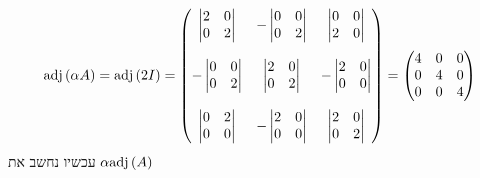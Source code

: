 \documentclass[12pt, titlepage]{article}
\begin{document}
\[
    \mathrm{adj}\left(\alpha A\right) = \mathrm{adj}\left(2I\right) = \begin{pmatrix}
        \begin{vmatrix} 2 & 0 \\ 0 & 2 \end{vmatrix} & -\begin{vmatrix} 0 & 0 \\ 0 & 2 \end{vmatrix} & \begin{vmatrix} 0 & 0 \\ 2 & 0 \end{vmatrix} \\ \\
 -       \begin{vmatrix} 0 & 0 \\ 0 & 2 \end{vmatrix} & \begin{vmatrix} 2 & 0 \\0 & 2 \end{vmatrix} & -\begin{vmatrix} 2 & 0 \\ 0 & 0\end{vmatrix} \\ \\
        \begin{vmatrix} 0 & 2 \\ 0 & 0\end{vmatrix} & -\begin{vmatrix} 2 & 0 \\ 0 & 0 \end{vmatrix} & \begin{vmatrix} 2 & 0 \\ 0 & 2\end{vmatrix}
     \end{pmatrix} = \begin{pmatrix}
        4 & 0 & 0 \\ 0 & 4 & 0 \\ 0 & 0 & 4        
     \end{pmatrix}
\]
עכשיו נחשב את $\alpha\mathrm{adj}\left(A\right)$
\end{document}
